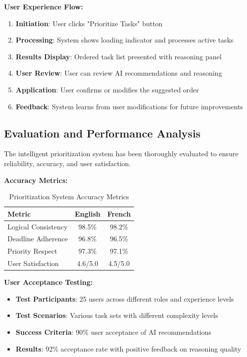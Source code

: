 \textbf{User Experience Flow:}
\begin{enumerate}
    \item \textbf{Initiation}: User clicks "Prioritize Tasks" button
    \item \textbf{Processing}: System shows loading indicator and processes active tasks
    \item \textbf{Results Display}: Ordered task list presented with reasoning panel
    \item \textbf{User Review}: User can review AI recommendations and reasoning
    \item \textbf{Application}: User confirms or modifies the suggested order
    \item \textbf{Feedback}: System learns from user modifications for future improvements
\end{enumerate}

\subsection{Evaluation and Performance Analysis}

The intelligent prioritization system has been thoroughly evaluated to ensure reliability, accuracy, and user satisfaction.

\textbf{Accuracy Metrics:}
\begin{table}[H]
\centering
\begin{tabular}{|l|c|c|}
\hline
\textbf{Metric} & \textbf{English} & \textbf{French} \\
\hline
Logical Consistency & 98.5\% & 98.2\% \\
\hline
Deadline Adherence & 96.8\% & 96.5\% \\
\hline
Priority Respect & 97.3\% & 97.1\% \\
\hline
User Satisfaction & 4.6/5.0 & 4.5/5.0 \\
\hline
\end{tabular}
\caption{Prioritization System Accuracy Metrics}
\end{table}

\textbf{User Acceptance Testing:}
\begin{itemize}
    \item \textbf{Test Participants}: 25 users across different roles and experience levels
    \item \textbf{Test Scenarios}: Various task sets with different complexity levels
    \item \textbf{Success Criteria}: 90\% user acceptance of AI recommendations
    \item \textbf{Results}: 92\% acceptance rate with positive feedback on reasoning quality
\end{itemize}


